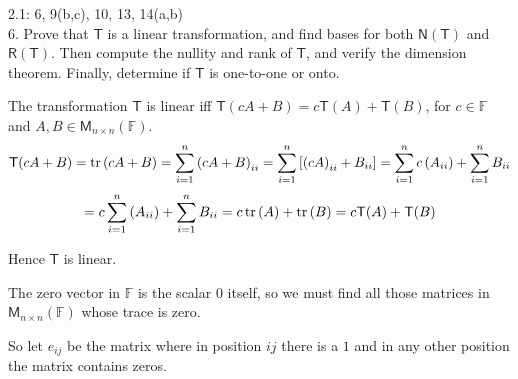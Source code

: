 \documentclass[11pt]{article}
\newcommand{\br}[1]{\left(#1\right)}
\newcommand{\sbr}[1]{\left[#1\right]}
\begin{document}
2.1: 6, 9(b,c), 10, 13, 14(a,b) \\

6. Prove that $\mathsf{T}$ is a linear transformation, and find bases for both $\mathsf{N(T)}$ and $\mathsf{R(T)}$. Then compute the nullity and rank of $\mathsf{T}$, and verify the dimension theorem. Finally, determine if $\mathsf{T}$ is one-to-one or onto.

The transformation $\mathsf{T}$ is linear iff $\mathsf{T}(cA+B) = c\mathsf{T}(A) + \mathsf{T}(B)$, for $c\in\mathbb{F}$ and $A,B\in \mathsf{M}_{n\times n}(\mathbb{F})$.
$$\mathsf{T}(cA+B) = \trace\br{cA+B} = \sum_{i=1}^n \br{cA+B}_{ii} = \sum_{i=1}^n \sbr{\br{cA}_{ii} + B_{ii}} = \sum_{i=1}^n c\br{A_{ii}} + \sum_{i=1}^n B_{ii}$$
$$= c\sum_{i=1}^n \br{A_{ii}} + \sum_{i=1}^n B_{ii} = c\trace\br{A} + \trace\br{B} = c\mathsf{T}(A) + \mathsf{T}(B)$$

Hence $\mathsf{T}$ is linear.

The zero vector in $\mathbb{F}$ is the scalar $0$ itself, so we must find all those matrices in $\mathsf{M}_{n\times n}(\mathbb{F})$ whose trace is zero.

So let $e_{ij}$ be the matrix where in position $ij$ there is a $1$ and in any other position the matrix contains zeros.
\end{document}
